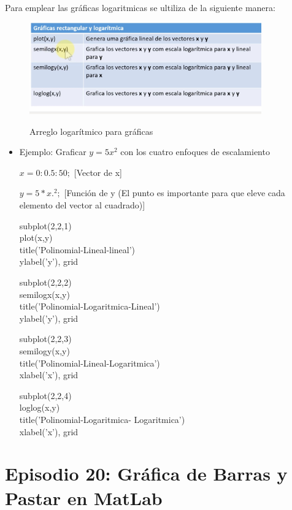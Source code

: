 \documentclass{article}
\begin{document}
				
	Para emplear las gráficas logaritmicas se ultiliza de la siguiente manera:
	
	\begin{figure}[h!]
		\centering
		\includegraphics[width = 100mm]{imagenes/Funciones/logaritmica}
		\label{logarit}
		\caption{Arreglo logarítmico para gráficas}
	\end{figure}
				
	\begin{itemize}
		\item Ejemplo: Graficar $y = 5x^2$ con los cuatro enfoques de escalamiento
		
		$x = 0:0.5:50;$		[Vector de x]
		
		$y = 5*x.^2;$		[Función de y (El punto es importante para que eleve cada elemento del vector al cuadrado)]
		
		subplot(2,2,1) \\
		plot(x,y)\\
		title('Polinomial-Lineal-lineal')\\
		ylabel('y'), grid
		
		subplot(2,2,2) \\
		semilogx(x,y)\\
		title('Polinomial-Logaritmica-Lineal')\\
		ylabel('y'), grid
		
		subplot(2,2,3) \\
		semilogy(x,y)\\
		title('Polinomial-Lineal-Logaritmica')\\
		xlabel('x'), grid
		
		subplot(2,2,4) \\
		loglog(x,y)\\
		title('Polinomial-Logaritmica- Logaritmica')\\
		xlabel('x'), grid
		
	\end{itemize}	
		
	\section{Episodio 20: Gráfica de Barras y Pastar en MatLab}
	
\end{document}
